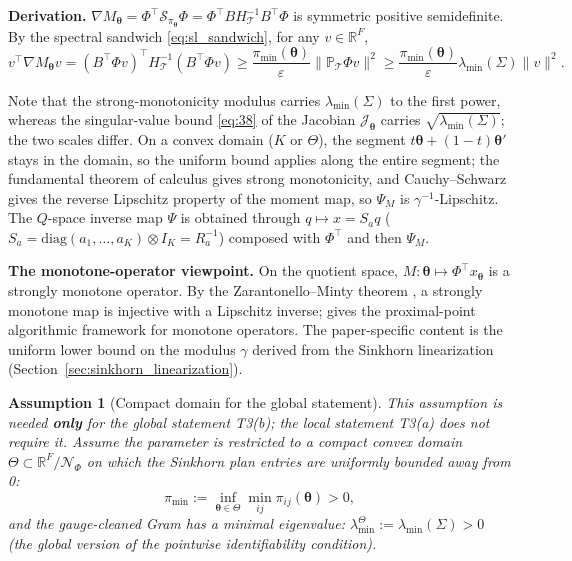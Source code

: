 \documentclass[11pt,a4paper]{article}
\newtheorem{assumption}[theorem]{Assumption}
\theoremstyle{remark}
\begin{document}
\textbf{Derivation.}
$\nabla M_{\bm{\theta}}=\Phi^{\top}\mathscr S_{\pi_{\bm{\theta}}}\Phi=\Phi^{\top}B H_{\mathcal{T}}^{-1}B^{\top}\Phi$
is symmetric positive semidefinite. By the spectral sandwich \eqref{eq:sl_sandwich}, for
any $v\in\mathbb{R}^F$,
\[
v^{\top}\nabla M_{\bm{\theta}}v=(B^{\top}\Phi v)^{\top}H_{\mathcal{T}}^{-1}(B^{\top}\Phi v)\ge\frac{\pi_{\min}(\bm{\theta})}{\varepsilon}\|\mathbb{P}_{\mathcal{T}}\Phi v\|^2\ge\frac{\pi_{\min}(\bm{\theta})}{\varepsilon}\lambda_{\min}(\Sigma)\|v\|^2.
\]

Note that the strong-monotonicity modulus carries $\lambda_{\min}(\Sigma)$ to the first
power, whereas the singular-value bound \eqref{eq:38} of the Jacobian
$\mathcal{J}_{\bm{\theta}}$ carries $\sqrt{\lambda_{\min}(\Sigma)}$; the two scales differ.
On a convex domain ($K$ or $\Theta$), the segment $t\bm{\theta}+(1-t)\bm{\theta}'$ stays in
the domain, so the uniform bound applies along the entire segment; the fundamental theorem
of calculus gives strong monotonicity, and Cauchy--Schwarz gives the reverse Lipschitz
property of the moment map, so $\Psi_M$ is $\gamma^{-1}$-Lipschitz. The $Q$-space inverse
map $\Psi$ is obtained through $q\mapsto x=S_a q$
($S_a=\mathrm{diag}(a_1,\dots,a_K)\otimes I_K=R_a^{-1}$) composed with $\Phi^{\top}$ and
then $\Psi_M$.

\textbf{The monotone-operator viewpoint.} On the quotient space,
$M:\bm{\theta}\mapsto\Phi^{\top}x_{\bm{\theta}}$ is a strongly monotone operator. By the
Zarantonello--Minty theorem \cite{zarantonello1960,minty1962monotone}, a strongly monotone
map is injective with a Lipschitz inverse; \cite{rockafellar1976monotone} gives the
proximal-point algorithmic framework for monotone operators. The paper-specific content is
the uniform lower bound on the modulus $\gamma$ derived from the Sinkhorn linearization
(Section~\ref{sec:sinkhorn_linearization}).

\begin{assumption}[Compact domain for the global statement]\label{asm:pos}
This assumption is needed \textbf{only} for the global statement T3(b); the local
statement T3(a) does not require it. Assume the parameter is restricted to a compact
convex domain $\Theta\subset\mathbb{R}^F/\mathcal{N}_\Phi$ on which the Sinkhorn plan
entries are uniformly bounded away from 0:
\[
\pi_{\min}:=\inf_{\bm{\theta}\in\Theta}\min_{ij}\pi_{ij}(\bm{\theta})>0,
\]
and the gauge-cleaned Gram has a minimal eigenvalue:
$\lambda_{\min}^{\Theta}:=\lambda_{\min}(\Sigma)>0$ (the global version of the pointwise
identifiability condition).
\end{assumption}
\end{document}
